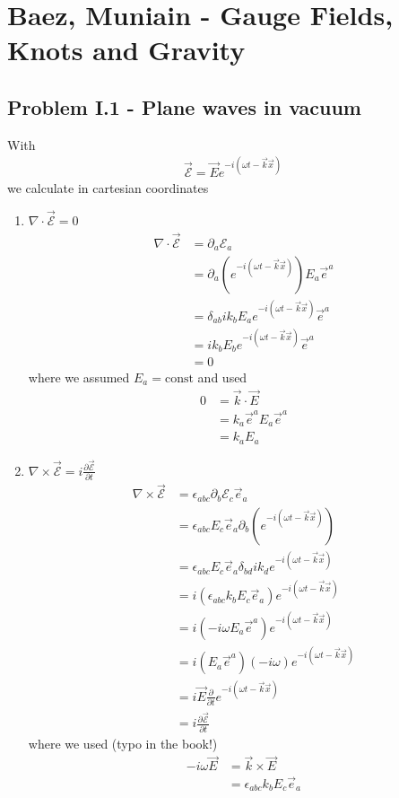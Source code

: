 \documentclass[10pt,a4paper]{book}
\theoremstyle{definition}
\begin{document}
\section{{\sc Baez, Muniain} - Gauge Fields, Knots and Gravity}
\subsection{Problem I.1 - Plane waves in vacuum}
With
\begin{align}
    \vec{\mathcal{E}}=\vec{E}e^{-i(\omega t -\vec{k}\vec{x})}
\end{align}
we calculate in cartesian coordinates 
\begin{enumerate}
    \item $\nabla\cdot\vec{\mathcal{E}}=0$
\begin{align}
    \nabla\cdot\vec{\mathcal{E}}&=\partial_a\mathcal{E}_a\\
    &=\partial_a(e^{-i(\omega t -\vec{k}\vec{x})})E_a\vec{e}^a\\
    &=\delta_{ab}ik_bE_a e^{-i(\omega t -\vec{k}\vec{x})}\vec{e}^a\\
    &=ik_bE_b e^{-i(\omega t -\vec{k}\vec{x})}\vec{e}^a\\
    &=0
\end{align}
where we assumed $E_a=\text{const}$ and used
\begin{align}
    0&=\vec{k}\cdot\vec{E}\\
    &=k_a\vec{e}^aE_a\vec{e}^a\\
    &=k_aE_a
\end{align}

\item $\nabla\times\vec{\mathcal{E}}=i\frac{\partial\vec{\mathcal{E}}}{\partial t}$
\begin{align}
    \nabla\times\vec{\mathcal{E}}&=\epsilon_{abc}\partial_b\mathcal{E}_c\vec{e}_a \\
    &=\epsilon_{abc}E_c\vec{e}_a\partial_b(e^{-i(\omega t -\vec{k}\vec{x})}) \\
    &=\epsilon_{abc}E_c\vec{e}_a\delta_{bd}ik_de^{-i(\omega t -\vec{k}\vec{x})} \\
    &=i(\epsilon_{abc}k_bE_c\vec{e}_a)e^{-i(\omega t -\vec{k}\vec{x})} \\
    &=i(-i\omega E_a\vec{e}^a)e^{-i(\omega t -\vec{k}\vec{x})} \\
    &=i(E_a\vec{e}^a)(-i\omega) e^{-i(\omega t -\vec{k}\vec{x})} \\
    &=i\vec{E}\frac{\partial}{\partial t} e^{-i(\omega t -\vec{k}\vec{x})} \\
    &=i\frac{\partial\vec{\mathcal{E}}}{\partial t}
\end{align}
where we used (typo in the book!)
\begin{align}
    -i\omega\vec{E}&=\vec{k}\times\vec{E}\\
    &=\epsilon_{abc}k_bE_c\vec{e}_a
\end{align}
\end{enumerate}
\end{document}
